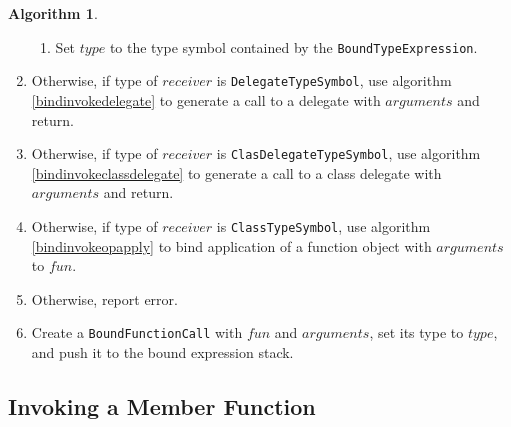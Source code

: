 \documentclass[a4paper,oneside,11pt]{book}
\theoremstyle{definition}
\newtheorem{algo}{Algorithm}[section]
\begin{document}
\begin{algo}
\begin{enumerate}
\begin{enumerate}
\item
Set $type$ to the type symbol contained by the \verb|BoundTypeExpression|.
\end{enumerate}
\item
Otherwise, if type of $receiver$ is \verb|DelegateTypeSymbol|, use algorithm \ref{bindinvokedelegate}
to generate a call to a delegate with $arguments$ and return.
\item
Otherwise, if type of $receiver$ is \verb|ClasDelegateTypeSymbol|, use algorithm \ref{bindinvokeclassdelegate}
to generate a call to a class delegate with $arguments$ and return.
\item
Otherwise, if type of $receiver$ is \verb|ClassTypeSymbol|, use algorithm \ref{bindinvokeopapply}
to bind application of a function object with $arguments$ to $fun$.
\item
Otherwise, report error.
\item
Create a \verb|BoundFunctionCall| with $fun$ and $arguments$, set its type to $type$, and push it to the bound expression stack.
\end{enumerate}
\end{algo}

\subsection{Invoking a Member Function}
\end{document}
